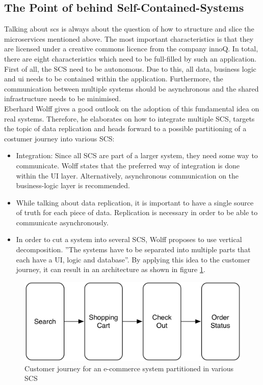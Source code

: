 \subsection{The Point of behind Self-Contained-Systems}
Talking about \acrfull{scs} is always about the question of how to structure and slice the microservices mentioned above.\newline
The most important characteristics is that they are licensed under a creative commons licence from the company innoQ. In total, there are eight characteristics which need to be full-filled by such an application. First of all, the SCS need to be autonomous. Due to this, all data, business logic and \acrshort{ui} needs to be contained within the application. Furthermore, the communication between multiple systems should be asynchronous and the shared infrastructure needs to be minimised. \cite{scs}\newline
\\
Eberhard Wolff gives a good outlook on the adoption of this fundamental idea on real systems. Therefore, he elaborates on how to integrate multiple SCS, targets the topic of data replication and heads forward to a possible partitioning of a costumer journey into various SCS:\newline
\begin{itemize}
    \item Integration: Since all SCS are part of a larger system, they need some way to communicate. Wolff states that the preferred way of integration is done within the UI layer. Alternatively, asynchronous communication on the business-logic layer is recommended.
    \item While talking about data replication, it is important to have a single source of truth for each piece of data. Replication is necessary in order to be able to communicate asynchronously.
    \item In order to cut a system into several SCS, Wolff proposes to use vertical decomposition. ''The systems have to be separated into multiple parts that each have a UI, logic and database''\cite{scsWolf}. By applying this idea to the customer journey, it can result in an architecture as shown in figure \ref{fig:scsJourney}.
\end{itemize}
\cite{scsWolf}\newline
\begin{figure}[!htb]
    \centering
    \includegraphics[scale=0.2]{pictures/Journey.png}
    \caption{Customer journey for an e-commerce system partitioned in various SCS \cite{scsWolf}}
    \label{fig:scsJourney}
\end{figure}

